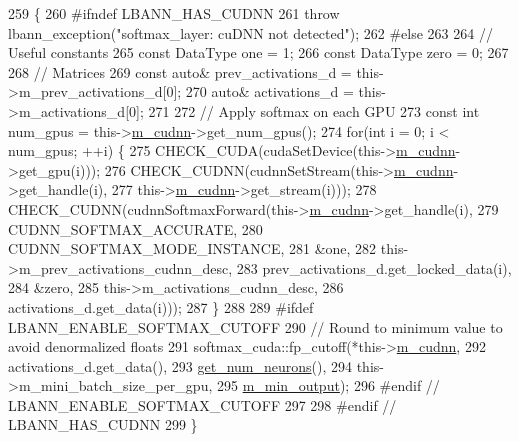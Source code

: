 \begin{DoxyCode}
259                           \{
260 \textcolor{preprocessor}{  #ifndef LBANN\_HAS\_CUDNN}
261     \textcolor{keywordflow}{throw} lbann\_exception(\textcolor{stringliteral}{"softmax\_layer: cuDNN not detected"});
262 \textcolor{preprocessor}{  #else}
263     
264     \textcolor{comment}{// Useful constants}
265     \textcolor{keyword}{const} DataType one = 1;
266     \textcolor{keyword}{const} DataType zero = 0;
267 
268     \textcolor{comment}{// Matrices}
269     \textcolor{keyword}{const} \textcolor{keyword}{auto}& prev\_activations\_d = this->m\_prev\_activations\_d[0];
270     \textcolor{keyword}{auto}& activations\_d = this->m\_activations\_d[0];
271 
272     \textcolor{comment}{// Apply softmax on each GPU}
273     \textcolor{keyword}{const} \textcolor{keywordtype}{int} num\_gpus = this->\hyperlink{classlbann_1_1Layer_a08dbb94239e3b8c96329786c57c72e21}{m\_cudnn}->get\_num\_gpus();
274     \textcolor{keywordflow}{for}(\textcolor{keywordtype}{int} i = 0; i < num\_gpus; ++i) \{
275       CHECK\_CUDA(cudaSetDevice(this->\hyperlink{classlbann_1_1Layer_a08dbb94239e3b8c96329786c57c72e21}{m\_cudnn}->get\_gpu(i)));
276       CHECK\_CUDNN(cudnnSetStream(this->\hyperlink{classlbann_1_1Layer_a08dbb94239e3b8c96329786c57c72e21}{m\_cudnn}->get\_handle(i),
277                                  this->\hyperlink{classlbann_1_1Layer_a08dbb94239e3b8c96329786c57c72e21}{m\_cudnn}->get\_stream(i)));
278       CHECK\_CUDNN(cudnnSoftmaxForward(this->\hyperlink{classlbann_1_1Layer_a08dbb94239e3b8c96329786c57c72e21}{m\_cudnn}->get\_handle(i),
279                                       CUDNN\_SOFTMAX\_ACCURATE,
280                                       CUDNN\_SOFTMAX\_MODE\_INSTANCE,
281                                       &one,
282                                       this->m\_prev\_activations\_cudnn\_desc,
283                                       prev\_activations\_d.get\_locked\_data(i),
284                                       &zero,
285                                       this->m\_activations\_cudnn\_desc,
286                                       activations\_d.get\_data(i)));
287     \}
288 
289 \textcolor{preprocessor}{  #ifdef LBANN\_ENABLE\_SOFTMAX\_CUTOFF}
290     \textcolor{comment}{// Round to minimum value to avoid denormalized floats}
291     softmax\_cuda::fp\_cutoff(*this->\hyperlink{classlbann_1_1Layer_a08dbb94239e3b8c96329786c57c72e21}{m\_cudnn},
292                             activations\_d.get\_data(),
293                             \hyperlink{classlbann_1_1Layer_aa4de686cc6c2dd38166f42faf874f227}{get\_num\_neurons}(),
294                             this->m\_mini\_batch\_size\_per\_gpu,
295                             \hyperlink{classlbann_1_1softmax__layer_ab3bf2d92f4441923dd0b792c38ec774a}{m\_min\_output});
296 \textcolor{preprocessor}{  #endif // LBANN\_ENABLE\_SOFTMAX\_CUTOFF}
297     
298 \textcolor{preprocessor}{  #endif // LBANN\_HAS\_CUDNN}
299   \}
\end{DoxyCode}
